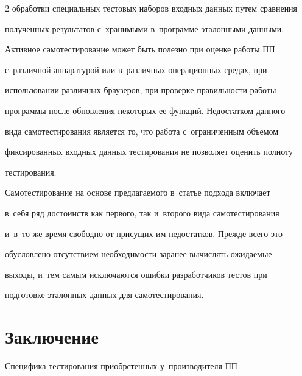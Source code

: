 \begin{multicols}{2}
обработки специальных тестовых наборов входных данных путем сравнения 


полученных результатов с~хранимыми в~программе эталонными данными.


    


    Активное самотестирование может быть полезно при оценке работы ПП 


с~различной аппаратурой или в~различных операционных средах, при 


использовании различных браузеров, при проверке правильности работы 


программы после обновления некоторых ее функций. Недостатком данного 


вида самотестирования является то, что работа с~ограниченным объемом 


фиксированных входных данных тестирования не позволяет оценить полноту 


тестирования.


    


    Самотестирование на основе предлагаемого в~статье подхода включает 


в~себя ряд достоинств как первого, так и~второго вида самотестирования 


и~в~то же время свободно от присущих им недостатков. Прежде всего это 


обусловлено отсутствием необходимости заранее вычислять ожидаемые 


выходы, и~тем самым исключаются ошибки разработчиков тестов при 


подготовке эталонных данных для самотестирования.





\vspace*{-9pt}


    


\section{Заключение}





\vspace*{-3pt}





    Специфика тестирования приобретенных у~производителя ПП



\end{multicols}

